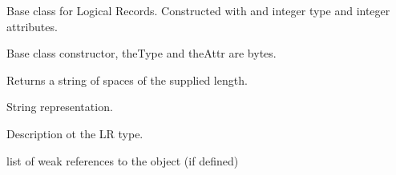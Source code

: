 \documentclass[letterpaper,10pt,english]{sphinxmanual}
\begin{document}

\begin{fulllineitems}
\label{\detokenize{ref/LIS/core/LogiRec:TotalDepth.LIS.core.LogiRec.LrBase}}
Base class for Logical Records.
Constructed with and integer type and integer attributes.

\begin{fulllineitems}
\label{\detokenize{ref/LIS/core/LogiRec:TotalDepth.LIS.core.LogiRec.LrBase.__init__}}
Base class constructor, theType and theAttr are bytes.

\end{fulllineitems}


\begin{fulllineitems}
\label{\detokenize{ref/LIS/core/LogiRec:TotalDepth.LIS.core.LogiRec.LrBase.init}}
Returns a string of spaces of the supplied length.

\end{fulllineitems}


\begin{fulllineitems}
\label{\detokenize{ref/LIS/core/LogiRec:TotalDepth.LIS.core.LogiRec.LrBase.__str__}}
String representation.

\end{fulllineitems}


\begin{fulllineitems}
\label{\detokenize{ref/LIS/core/LogiRec:TotalDepth.LIS.core.LogiRec.LrBase.desc}}
Description ot the LR type.

\end{fulllineitems}


\begin{fulllineitems}
\label{\detokenize{ref/LIS/core/LogiRec:TotalDepth.LIS.core.LogiRec.LrBase.__weakref__}}
list of weak references to the object (if defined)

\end{fulllineitems}


\end{fulllineitems}
\end{document}
